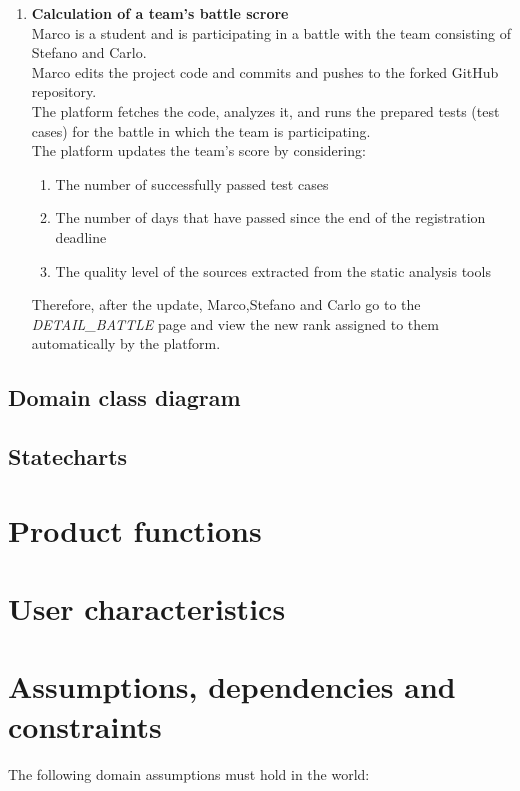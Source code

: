 \begin{enumerate}
\item \textbf{Calculation of a team's battle scrore}\\
Marco is a student and is participating in a battle with the team consisting of Stefano and Carlo.\\
Marco edits the project code and commits and pushes to the forked GitHub repository. \\
The platform fetches the code, analyzes it, and runs the prepared tests (test cases) for the battle in which the team is participating.\\
The platform updates the team's score by considering:
				\begin{enumerate}
					\item The number of successfully passed test cases
					\item The number of days that have passed since the end of the registration deadline
					\item The quality level of the sources extracted from the static analysis tools 
				\end{enumerate}
Therefore, after the update, Marco,Stefano and Carlo go to the \emph{DETAIL\_BATTLE} page and view the new rank assigned to them automatically by the platform.
    	
\end{enumerate}


\subsection{Domain class diagram}

\subsection{Statecharts}




\section{Product functions}



\section{User characteristics}



\section{Assumptions, dependencies and constraints}
The following domain assumptions must hold in the world:

